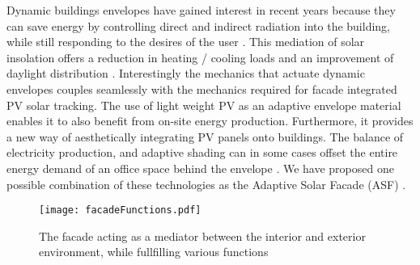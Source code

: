 Dynamic buildings envelopes have gained interest in recent years because they can save energy by controlling direct and indirect radiation into the building, while still responding to the desires of the user \cite{loonen2013climate}. This mediation of solar insolation offers a reduction in heating / cooling loads and an improvement of daylight distribution \cite{rossi2012adaptive}. Interestingly the mechanics that actuate dynamic envelopes couples seamlessly with the mechanics required for facade integrated PV solar tracking. The use of light weight PV as an adaptive envelope material enables it to also benefit from on-site energy production. Furthermore, it provides a new way of aesthetically integrating PV panels onto buildings. The balance of electricity production, and adaptive shading can in some cases offset the entire energy demand of an office space behind the envelope \cite{jayathissa2015abs}. We have proposed one possible combination of these technologies as the Adaptive Solar Facade (ASF) \cite{nagy2015frontiers}.







\begin{figure}[H]
\begin{center}
\texttt{[image: facadeFunctions.pdf]}
\caption{The facade acting as a mediator between the interior and exterior environment, while fullfilling various functions \cite{nagy2015frontiers}}
\label{fig:ASFschematic}
\end{center}
\end{figure}

